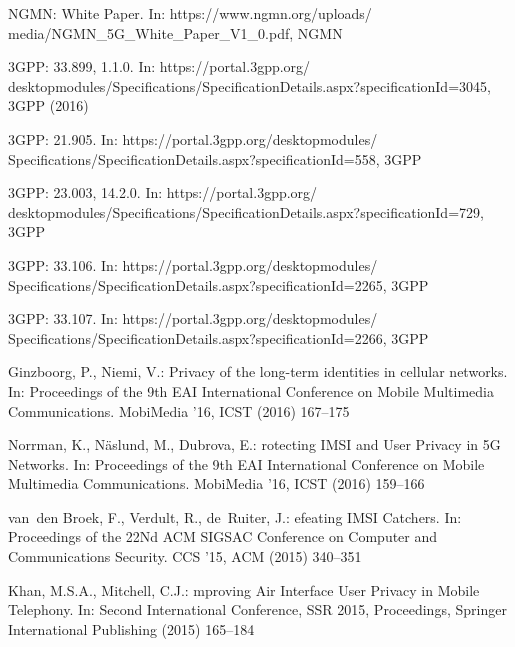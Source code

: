 \documentclass{llncs} %
\begin{document}
\begin{thebibliography}{5}

NGMN:
 {W}hite {P}aper.
\newblock In:
  https://www.ngmn.org/uploads/\\media/NGMN\_5G\_White\_Paper\_V1\_0.pdf, NGMN

3GPP:
 33.899, 1.1.0.
\newblock In:
  https://portal.3gpp.org/\\desktopmodules/Specifications/SpecificationDetails.aspx?specificationId=3045,
  3GPP (2016)

3GPP:
 21.905.
\newblock In:
  https://portal.3gpp.org/desktopmodules/\\Specifications/SpecificationDetails.aspx?specificationId=558,
  3GPP

3GPP:
 23.003, 14.2.0.
\newblock In:
  https://portal.3gpp.org/\\desktopmodules/Specifications/SpecificationDetails.aspx?specificationId=729,
  3GPP

3GPP:
 33.106.
\newblock In:
  https://portal.3gpp.org/desktopmodules/\\Specifications/SpecificationDetails.aspx?specificationId=2265,
  3GPP

3GPP:
 33.107.
\newblock In:
  https://portal.3gpp.org/desktopmodules/\\Specifications/SpecificationDetails.aspx?specificationId=2266,
  3GPP

Ginzboorg, P., Niemi, V.:
\newblock Privacy of the long-term identities in cellular networks.
\newblock In: Proceedings of the 9th EAI International Conference on Mobile
  Multimedia Communications. MobiMedia '16, ICST (2016)  167--175

Norrman, K., N\"{a}slund, M., Dubrova, E.:
rotecting {IMSI} and {U}ser {P}rivacy in {5G} {N}etworks.
\newblock In: Proceedings of the 9th EAI International Conference on Mobile
  Multimedia Communications. MobiMedia '16, ICST (2016)  159--166

van~den Broek, F., Verdult, R., de~Ruiter, J.:
efeating {IMSI} {C}atchers.
\newblock In: Proceedings of the 22Nd ACM SIGSAC Conference on Computer and
  Communications Security. CCS '15, ACM (2015)  340--351

Khan, M.S.A., Mitchell, C.J.:
mproving {A}ir {I}nterface {U}ser {P}rivacy in {M}obile
  {T}elephony.
\newblock In: Second International Conference, SSR 2015, Proceedings, Springer
  International Publishing (2015)  165--184


\end{thebibliography}
\end{document}
